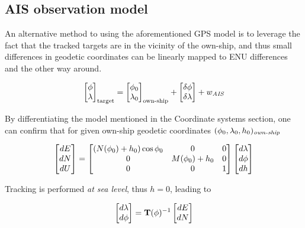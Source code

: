 \subsection{AIS observation model}

An alternative method to using the aforementioned GPS model is to leverage the fact that the tracked targets are in the vicinity of the own-ship, and thus small differences in geodetic coordinates can be linearly mapped to ENU differences and the other way around\cite{Wellenhof1997}.



\begin{equation}
	\begin{bmatrix}
		{\phi}\\ {\lambda}
		\end{bmatrix}_{\text{target}}=
		\begin{bmatrix}
		{\phi}_{0}\\ {\lambda}_{0}
	\end{bmatrix}_{\text{own-ship}} + \begin{bmatrix}
	\delta{\phi} \\ \delta{\lambda}
	\end{bmatrix} + {w}_{\textit{AIS}}
\end{equation}


By differentiating the model mentioned in the Coordinate systems section, one can confirm that for given own-ship geodetic coordinates $({\phi}_0,{\lambda}_0, h_0)_{\textit{own-ship}}$



\begin{equation}
\begin{bmatrix}
dE\\dN\\dU
\end{bmatrix}=
\begin{bmatrix}
(N({\phi}_0)+h_0)\cos{\phi}_0 &0 &0\\
0 &M({\phi}_0) + h_0 &0\\
0 &0 &1
\end{bmatrix}
\begin{bmatrix}
d{\lambda}\\d{\phi}\\dh
\end{bmatrix}
\end{equation}


Tracking is performed \emph{at sea level}, thus $h=0$, leading to


\begin{equation}
\begin{bmatrix}
d{\lambda}\\ d{\phi}
\end{bmatrix}=
\mathbf{T}({\phi})^{-1}
\begin{bmatrix}
dE\\ dN
\end{bmatrix}
\end{equation}



